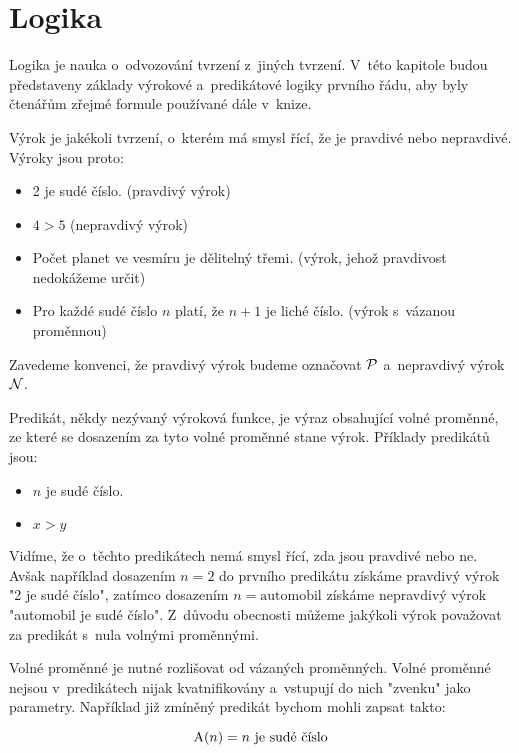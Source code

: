 \chapter{Logika}

Logika je nauka o~odvozování tvrzení z~jiných tvrzení. V~této kapitole budou představeny základy výrokové a~predikátové logiky prvního řádu, aby byly čtenářům zřejmé formule používané dále v~knize.

Výrok je jakékoli tvrzení, o~kterém má smysl řící, že je pravdivé nebo nepravdivé. Výroky jsou proto:

\begin{itemize}
	\item 2 je sudé číslo. (pravdivý výrok)
	\item \(4 > 5\) (nepravdivý výrok)
	\item Počet planet ve vesmíru je dělitelný třemi. (výrok, jehož pravdivost nedokážeme určit)
	\item Pro každé sudé číslo \(n\) platí, že \(n + 1\) je liché číslo. (výrok s~vázanou proměnnou)
\end{itemize}

Zavedeme konvenci, že pravdivý výrok budeme označovat \(\mathcal{P}\) a~nepravdivý výrok \(\mathcal{N}\).

Predikát, někdy nezývaný výroková funkce, je výraz obsahující volné proměnné, ze které se dosazením za tyto volné proměnné stane výrok. Příklady predikátů jsou:

\begin{itemize}
	\item \(n\) je sudé číslo.
	\item \(x > y\)
\end{itemize}

Vidíme, že o~těchto predikátech nemá smysl řící, zda jsou pravdivé nebo ne. Avšak například dosazením \(n = 2\) do prvního predikátu získáme pravdivý výrok "2 je sudé číslo", zatímco dosazením \(n = \mathrm{automobil}\) získáme nepravdivý výrok "automobil je sudé číslo". Z~důvodu obecnosti můžeme jakýkoli výrok považovat za predikát s~nula volnými proměnnými.

Volné proměnné je nutné rozlišovat od vázaných proměnných. Volné proměnné nejsou v~predikátech nijak kvatnifikovány a~vstupují do nich "zvenku" jako parametry. Například již zmíněný predikát bychom mohli zapsat takto:

\begin{equation}
\mathrm{A}(n) = n \ \text{je sudé číslo}
\end{equation}


